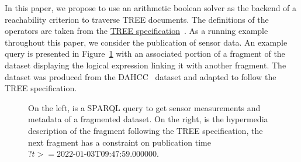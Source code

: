 In this paper, we propose to use an arithmetic boolean solver as the backend of a reachability criterion to traverse TREE documents.
The definitions of the operators are taken from the \href{https://treecg.github.io/specification/}{TREE specification}~.
As a running example throughout this paper, we consider the publication of sensor data.
An example query is presented in Figure~\ref{lst:system} with an associated portion of a fragment of the dataset displaying the logical expression linking it with another fragment.
The dataset was produced from the DAHCC~\cite{dahcc_resource} dataset and adapted to follow the TREE specification.

\begin{figure}[h]
    \begin{minipage}{0.50\textwidth}
        \centering
        
    \end{minipage}
    \hspace{0.05\textwidth}
    \begin{minipage}{0.43\textwidth}
        \centering
        
    \end{minipage}
    \caption{On the left, is a SPARQL query to get sensor measurements and metadata of a fragmented dataset.
    On the right, is the hypermedia description of the fragment following the TREE specification, the next fragment
    has a constraint on publication time $?t>= \text{2022-01-03T09:47:59.000000}$.}
        \label{lst:system}
\end{figure}